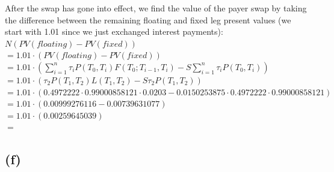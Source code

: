 \documentclass{article}
\begin{document}
{After the swap has gone into effect, we find the value of the payer swap by taking the difference between the remaining floating and fixed leg present values (we start with 1.01 since we just exchanged interest payments): \\
$N(PV(floating) - PV(fixed))$ \\
$= 1.01 \cdot (PV(floating) - PV(fixed))$ \\
$= 1.01 \cdot (\sum_{i=1}^{n} \tau_i P(T_0, T_i) F(T_0; T_{i-1}, T_i) - S \sum_{i=1}^{n} \tau_i P(T_0, T_i))$ \\ 
$= 1.01 \cdot (\tau_2 P(T_1, T_2) L(T_1, T_2) - S \tau_2 P(T_1, T_2))$ \\
$= 1.01 \cdot (0.4972222 \cdot 0.99000858121 \cdot 0.0203 - 0.0150253875 \cdot 0.4972222 \cdot 0.99000858121)$ \\
$= 1.01 \cdot (0.00999276116 - 0.00739631077)$ \\
$= 1.01 \cdot (0.00259645039)$ \\
$= $ 

\subsection*{(f)}

}
\end{document}
